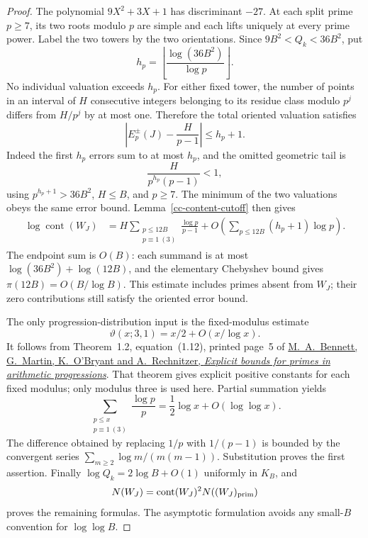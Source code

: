 \begin{proof}
The polynomial \(9X^2+3X+1\) has discriminant \(-27\). At each
split prime \(p\ge7\), its two roots modulo \(p\) are simple and each
lifts uniquely at every prime power. Label the two towers by the two
orientations. Since \(9B^2<Q_k<36B^2\), put
\[
 h_p=\left\lfloor\frac{\log(36B^2)}{\log p}\right\rfloor .
\]
No individual valuation exceeds \(h_p\). For either fixed tower, the
number of points in an interval of \(H\) consecutive integers belonging
to its residue class modulo \(p^j\) differs from \(H/p^j\) by at most
one. Therefore the total oriented valuation satisfies
\[
 \left|E_p^\pm(J)-\frac H{p-1}\right|\le h_p+1.
\]
Indeed the first \(h_p\) errors sum to at most \(h_p\), and the omitted
geometric tail is
\[
 \frac H{p^{h_p}(p-1)}<1,
\]
using \(p^{h_p+1}>36B^2\), \(H\le B\), and \(p\ge7\).
The minimum of the two valuations obeys the same error bound.
Lemma~\ref{cc-content-cutoff} then gives
\begin{align*}
 \log\operatorname{cont}(W_J)
 &=H\sum_{\substack{p\le12B\\p\equiv1\ (3)}}
       \frac{\log p}{p-1}
   +O\!\left(\sum_{p\le12B}(h_p+1)\log p\right).
\end{align*}
The endpoint sum is \(O(B)\): each summand is at most
\(\log(36B^2)+\log(12B)\), and the elementary Chebyshev bound gives
\(\pi(12B)=O(B/\log B)\). This estimate includes primes absent from
\(W_J\); their zero contributions still satisfy the oriented error bound.

The only progression-distribution input is the fixed-modulus estimate
\[
 \vartheta(x;3,1)=x/2+O(x/\log x).
\]
It follows from Theorem~1.2, equation~(1.12), printed page~5 of
\href{https://arxiv.org/abs/1802.00085v3}
{M.~A.~Bennett, G.~Martin, K.~O'Bryant and A.~Rechnitzer,
\emph{Explicit bounds for primes in arithmetic progressions}}.
That theorem gives explicit positive constants for each fixed modulus;
only modulus three is used here. Partial summation yields
\[
 \sum_{\substack{p\le x\\p\equiv1\ (3)}}\frac{\log p}{p}
       =\frac12\log x+O(\log\log x).
\]
The difference obtained by replacing \(1/p\) with \(1/(p-1)\) is
bounded by the convergent series \(\sum_{m\ge2}\log m/(m(m-1))\).
Substitution proves the first assertion. Finally
\(\log Q_k=2\log B+O(1)\) uniformly in \(K_B\), and
\[
 N(W_J)=\operatorname{cont}(W_J)^2 N((W_J)_{\rm prim})
\]
proves the remaining formulas. The asymptotic formulation avoids any
small-\(B\) convention for \(\log\log B\).
\end{proof}

